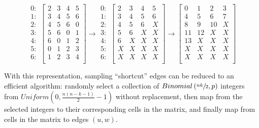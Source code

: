 \documentclass[a4paper,num-refs,gigabyte]{oup-contemporary}
\begin{document}
\begin{equation}
\begin{matrix}
0:\\
1:\\
2:\\
3:\\
4:\\
5:\\
6:\\
\end{matrix}
\begin{bmatrix}
2 & 3 & 4 & 5\\
3 & 4 & 5 & 6\\
4 & 5 & 6 & 0\\
5 & 6 & 0 & 1\\
6 & 0 & 1 & 2\\
0 & 1 & 2 & 3\\
1 & 2 & 3 & 4\\
\end{bmatrix}
\rightarrow
\begin{matrix}
0:\\
1:\\
2:\\
3:\\
4:\\
5:\\
6:\\
\end{matrix}
\begin{bmatrix}
2 & 3 & 4 & 5\\
3 & 4 & 5 & 6\\
4 & 5 & 6 & X\\
5 & 6 & X & X\\
6 & X & X & X\\
X & X & X & X\\
X & X & X & X\\
\end{bmatrix}
\rightarrow
\begin{bmatrix}
0 & 1 & 2 & 3\\
4 & 5 & 6 & 7\\
8 & 9 & 10 & X\\
11 & 12 & X & X\\
13 & X & X & X\\
X & X & X & X\\
X & X & X & X\\
\end{bmatrix}
\end{equation}

With this representation, sampling ``shortcut'' edges can be reduced to an efficient algorithm: randomly select a collection of $Binomial\left(\sfrac{nk}{2},p\right)$ integers from $Uniform\left(0,\frac{n\left(n-k-1\right)}{2}-1\right)$ without replacement, then map from the selected integers to their corresponding cells in the matrix, and finally map from cells in the matrix to edges $\left(u,w\right)$.
\end{document}

